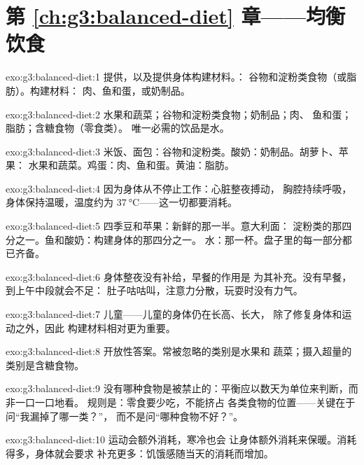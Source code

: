 \section*{第 \ref{ch:g3:balanced-diet} 章——均衡饮食}

\begin{solution}{exo:g3:balanced-diet:1}
提供，以及提供身体构建材料。：
谷物和淀粉类食物（或脂肪）。构建材料：
肉、鱼和蛋，或奶制品。
\end{solution}

\begin{solution}{exo:g3:balanced-diet:2}
水果和蔬菜；谷物和淀粉类食物；奶制品；肉、
鱼和蛋；脂肪；含糖食物（零食类）。
唯一必需的饮品是水。
\end{solution}

\begin{solution}{exo:g3:balanced-diet:3}
米饭、面包：谷物和淀粉类。酸奶：奶制品。胡萝卜、苹果：
水果和蔬菜。鸡蛋：肉、鱼和蛋。黄油：脂肪。
\end{solution}

\begin{solution}{exo:g3:balanced-diet:4}
因为身体从不停止工作：心脏整夜搏动，
胸腔持续呼吸，身体保持温暖，温度约为
$\qty{37}{\degreeCelsius}$——这一切都要消耗。
\end{solution}

\begin{solution}{exo:g3:balanced-diet:5}
四季豆和苹果：新鲜的那一半。意大利面：
淀粉类的那四分之一。鱼和酸奶：构建身体的那四分之一。
水：那一杯。盘子里的每一部分都已齐备。
\end{solution}

\begin{solution}{exo:g3:balanced-diet:6}
身体整夜没有补给，早餐的作用是
为其补充。没有早餐，到上午中段就会不足：
肚子咕咕叫，注意力分散，玩耍时没有力气。
\end{solution}

\begin{solution}{exo:g3:balanced-diet:7}
儿童——儿童的身体仍在长高、长大，
除了修复身体和运动之外，因此
构建材料相对更为重要。
\end{solution}

\begin{solution}{exo:g3:balanced-diet:8}
开放性答案。常被忽略的类别是水果和
蔬菜；摄入超量的类别是含糖食物。
\end{solution}

\begin{solution}{exo:g3:balanced-diet:9}
没有哪种食物是被禁止的：平衡应以数天为单位来判断，而非一口一口地看。
规则是：零食要少吃，不能挤占
各类食物的位置——关键在于问“我漏掉了哪一类？”，
而不是问“哪种食物不好？”。
\end{solution}

\begin{solution}{exo:g3:balanced-diet:10}
运动会额外消耗，寒冷也会
让身体额外消耗来保暖。消耗得多，身体就会要求
补充更多：饥饿感随当天的消耗而增加。
\end{solution}
